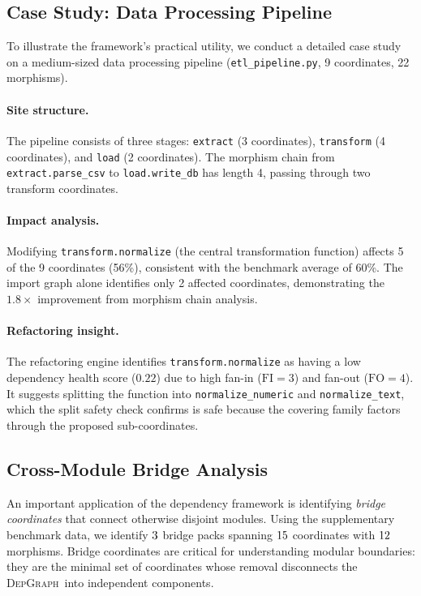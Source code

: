 \documentclass[11pt]{article}
\newcommand{\DepGraph}{\textsc{DepGraph}}
\begin{document}
\subsection{Case Study: Data Processing Pipeline}\label{sec:case-study}

To illustrate the framework's practical utility, we conduct a detailed case
study on a medium-sized data processing pipeline (\texttt{etl\_pipeline.py},
9 coordinates, 22 morphisms).

\paragraph{Site structure.}
The pipeline consists of three stages: \texttt{extract} (3 coordinates),
\texttt{transform} (4 coordinates), and \texttt{load} (2 coordinates).
The morphism chain from \texttt{extract.parse\_csv} to
\texttt{load.write\_db} has length 4, passing through two transform
coordinates.

\paragraph{Impact analysis.}
Modifying \texttt{transform.normalize} (the central transformation
function) affects 5 of the 9 coordinates (56\%), consistent with the
benchmark average of 60\%.  The import graph alone identifies only 2
affected coordinates, demonstrating the $1.8\times$ improvement from
morphism chain analysis.

\paragraph{Refactoring insight.}
The refactoring engine identifies \texttt{transform.normalize} as having
a low dependency health score ($0.22$) due to high fan-in ($\mathrm{FI} = 3$)
and fan-out ($\mathrm{FO} = 4$).  It suggests splitting the function into
\texttt{normalize\_numeric} and \texttt{normalize\_text}, which the
split safety check confirms is safe because the covering family factors
through the proposed sub-coordinates.

\subsection{Cross-Module Bridge Analysis}

An important application of the dependency framework is identifying
\emph{bridge coordinates} that connect otherwise disjoint modules.  Using
the supplementary benchmark data, we identify $3$ bridge
packs spanning $15$ coordinates with
$12$ morphisms.  Bridge coordinates are critical
for understanding modular boundaries: they are the minimal set of
coordinates whose removal disconnects the \DepGraph\ into independent
components.
\end{document}
